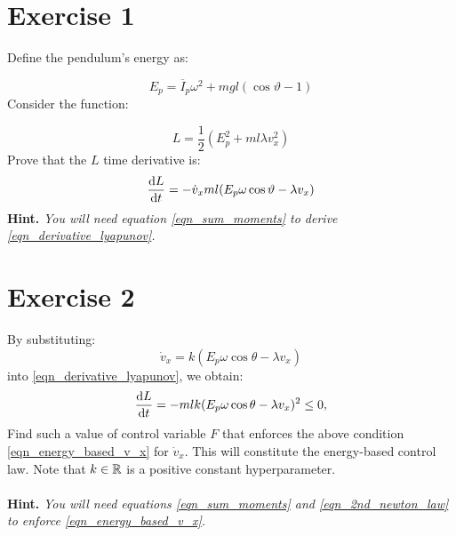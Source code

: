 \documentclass[12pt]{article}
\begin{document}
\section*{Exercise 1}

Define the pendulum's energy as:

$$
E_p =  \overline{I}_p  \omega ^ 2 + m g l (\cos{\vartheta} - 1)
$$
Consider the function:

\begin{equation}
    L = \frac{1}{2}(E_p^2 + ml\lambda v_x ^ 2)
\end{equation}
Prove that the $L$ time derivative is: 
\begin{equation}
\label{eqn_derivative_lyapunov}
\frac{\mathop{}\!\mathrm{d} L}{\mathop{}\!\mathrm{d} t} = - \dot{v}_x m l (E_p \omega \cos \vartheta - \lambda v_x)
\end{equation}
\textbf{Hint.} \textit{You will need equation \eqref{eqn_sum_moments} to derive \eqref{eqn_derivative_lyapunov}.}

\section*{Exercise 2}

By substituting:
\begin{equation}
\label{eqn_energy_based_v_x}
\dot{v}_x = k (E_p \omega \cos \theta - \lambda v_x)
\end{equation}
into \eqref{eqn_derivative_lyapunov}, we obtain:
$$
\frac{\mathop{}\!\mathrm{d} L}{\mathop{}\!\mathrm{d} t} = - mlk (E_p\omega \cos \theta  - \lambda v_x)^2 \leq 0,
$$
Find such a value of control variable $F$ that enforces the above condition \eqref{eqn_energy_based_v_x} for $\dot{v}_x$. 
This will constitute the energy-based control law. Note that $k\in {\mathbb{R}}$ is a positive constant hyperparameter.
\\
\\
\textbf{Hint.} \textit{You will need equations \eqref{eqn_sum_moments} and \eqref{eqn_2nd_newton_law} to enforce \eqref{eqn_energy_based_v_x}.}
\end{document}
